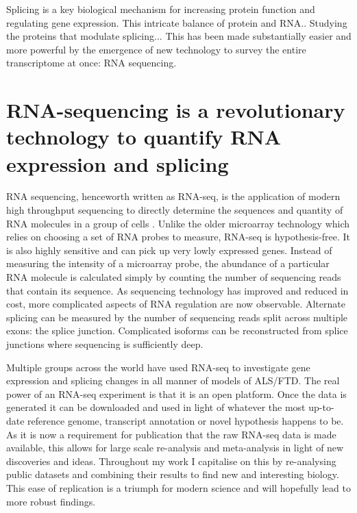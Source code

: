 Splicing is a key biological mechanism for increasing protein function and regulating gene expression.
This intricate balance of protein and RNA.. 
Studying the proteins that modulate splicing... 
This has been made substantially easier and more powerful by the emergence of new technology to survey the entire transcriptome at once: RNA sequencing.



\section{RNA-sequencing is a revolutionary technology to quantify RNA expression and splicing} %

RNA sequencing, henceworth written as RNA-seq, is the application of modern high throughput sequencing to directly determine the sequences and quantity of RNA molecules in a group of cells \citep{Wang2009}. Unlike the older microarray technology which relies on choosing a set of RNA probes to measure, RNA-seq is hypothesis-free. It is also highly sensitive and can pick up very lowly expressed genes. Instead of measuring the intensity of a microarray probe, the abundance of a particular RNA molecule is calculated simply by counting the number of sequencing reads that contain its sequence. As sequencing technology has improved and reduced in cost, more complicated aspects of RNA regulation are now observable. Alternate splicing can be measured by the number of sequencing reads split across multiple exons: the splice junction. Complicated isoforms can be reconstructed from splice junctions where sequencing is sufficiently deep.

Multiple groups across the world have used RNA-seq to investigate gene expression and splicing changes in all manner of models of ALS/FTD. 
The real power of an RNA-seq experiment is that it is an open platform. 
Once the data is generated it can be downloaded and used in light of whatever the most up-to-date reference genome, transcript annotation or novel hypothesis happens to be. 
As it is now a requirement for publication that the raw RNA-seq data is made available, this allows for large scale re-analysis and meta-analysis in light of new discoveries and ideas. 
Throughout my work I capitalise on this by re-analysing public datasets and combining their results to find new and interesting biology.
This ease of replication is a triumph for modern science and will hopefully lead to more robust findings.


